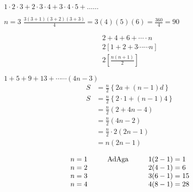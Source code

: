 $1 \cdot 2 \cdot 3 +2 \cdot 3 \cdot 4+ 3 \cdot 4 \cdot 5 +\ldots\ldots $

\medskip
$n=3$ \qquad $\frac{3(3+1)(3+2)(3+3)}{4} = 3(4)(5)(6)=\frac{360}{4}=90$

\begin{gather*}
2+4+6+ \cdots\cdot n\\
2[1+2+3\cdots\cdots n]\\
2\left[\frac{n(n+1)}{2}\right]
\end{gather*}

$1+5+9+13+ \cdots\cdots (4n-3)$
\begin{align*}
S &=\frac{n}{2}\left\{2a+(n-1)d\right\}\\
S &=\frac{n}{2}\left\{2\cdot 1 +(n-1)4\right\}\\
  &=\frac{n}{2}\left( 2 +4n-4\right)\\
  &=\frac{n}{2}(4n-2)\\
  &=\frac{n}{2}\cdot 2(2n -1)\\
  &=n(2n-1)
\end{align*}

$$
\begin{array}{c@{\hspace{1cm}}c@{\hspace{1cm}}l}
n=1 & \text{AdAga} & 1(2-1)=1\\
n=2 &              & 2(4-1)=6\\
n=3 &              & 3(6-1)=15\\
n=4 &              & 4(8-1)=28
\end{array}
$$
